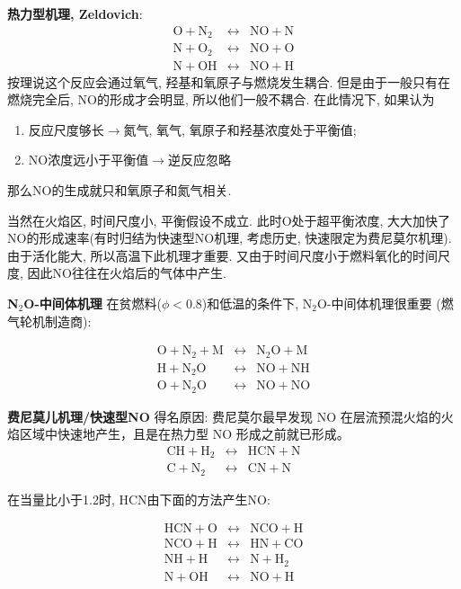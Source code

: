 \textbf{热力型机理, Zeldovich}:
\begin{eqnarray}
    \mathrm{O+N_2} &\leftrightarrow& \mathrm{NO + N}\\
    \mathrm{N+O_2} &\leftrightarrow& \mathrm{NO + O}\\
    \mathrm{N+OH} &\leftrightarrow& \mathrm{NO + H}
\end{eqnarray}
按理说这个反应会通过氧气, 羟基和氧原子与燃烧发生耦合. 但是由于一般只有在燃烧完全后, NO的形成才会明显, 所以他们一般不耦合. 在此情况下, 如果认为
\begin{enumerate}
    \item 反应尺度够长\(\to\)氮气, 氧气, 氧原子和羟基浓度处于平衡值;
    \item NO浓度远小于平衡值\(\to\)逆反应忽略
\end{enumerate}

那么NO的生成就只和氧原子和氮气相关.

当然在火焰区, 时间尺度小, 平衡假设不成立. 此时O处于超平衡浓度, 大大加快了NO的形成速率(有时归结为快速型NO机理, 考虑历史, 快速限定为费尼莫尔机理).
由于活化能大, 所以高温下此机理才重要. 又由于时间尺度小于燃料氧化的时间尺度, 因此NO往往在火焰后的气体中产生.

\textbf{N\(_2\)O-中间体机理}
在贫燃料(\(\phi<0.8\))和低温的条件下, N\(_2\)O-中间体机理很重要 (燃气轮机制造商):

\begin{eqnarray}
    \mathrm{O + N_2 + M} &\leftrightarrow& \mathrm{N_2O + M}\\
    \mathrm{H + N_2O} &\leftrightarrow& \mathrm{NO + NH}\\
    \mathrm{O + N_2O} &\leftrightarrow& \mathrm{NO + NO}
\end{eqnarray}


\textbf{费尼莫儿机理/快速型NO}
得名原因: 费尼莫尔最早发现 NO 在层流预混火焰的火焰区域中快速地产生，且是在热力型 NO 形成之前就已形成。
\begin{eqnarray}
    \mathrm{CH + H_2} &\leftrightarrow& \mathrm{HCN + N}\\
    \mathrm{C + N_2} &\leftrightarrow& \mathrm{CN + N}
\end{eqnarray}

在当量比小于1.2时, HCN由下面的方法产生NO:

\begin{eqnarray}
    \mathrm{HCN + O} &\leftrightarrow& \mathrm{NCO + H} \\
    \mathrm{NCO + H} &\leftrightarrow& \mathrm{HN + CO} \\
    \mathrm{NH + H} &\leftrightarrow& \mathrm{N + H_2} \\
    \mathrm{N + OH} &\leftrightarrow& \mathrm{NO + H}
\end{eqnarray}

